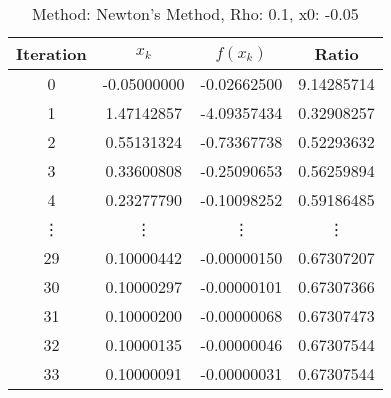 \begin{table}
\centering
\caption{Method: Newton's Method, Rho: 0.1, x0: -0.05}
\label{tab:table_Newton's_Method_0_1_-0_05}
\begin{tabular}{c c c c}
\toprule
Iteration &       $x_k$ &    $f(x_k)$ &      Ratio \\
\midrule
        0 & -0.05000000 & -0.02662500 & 9.14285714 \\
        1 &  1.47142857 & -4.09357434 & 0.32908257 \\
        2 &  0.55131324 & -0.73367738 & 0.52293632 \\
        3 &  0.33600808 & -0.25090653 & 0.56259894 \\
        4 &  0.23277790 & -0.10098252 & 0.59186485 \\
   \vdots &      \vdots &      \vdots &     \vdots \\
       29 &  0.10000442 & -0.00000150 & 0.67307207 \\
       30 &  0.10000297 & -0.00000101 & 0.67307366 \\
       31 &  0.10000200 & -0.00000068 & 0.67307473 \\
       32 &  0.10000135 & -0.00000046 & 0.67307544 \\
       33 &  0.10000091 & -0.00000031 & 0.67307544 \\
\bottomrule
\end{tabular}
\end{table}
